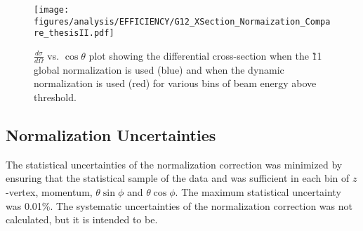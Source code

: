 \begin{figure}[h!]\begin{center}
\texttt{[image: \\figures/analysis/EFFICIENCY/G12\_XSection\_Normaization\_Compare\_thesisII.pdf]}
\caption[$\frac{d \sigma}{d \Omega}$ vs. $\cos \theta$ plot showing the  \piz differential cross-section when the \G11 global normalization is used (blue) and when the  dynamic normalization is used (red) for various bins of beam energy above  threshold]{\label{fig:toteff_compareII} $\frac{d \sigma}{d \Omega}$ vs. $\cos \theta$ plot showing the  \piz differential cross-section when the \G11 global normalization is used (blue) and when the  dynamic normalization is used (red) for various bins of beam energy above  threshold.}
\end{center}\end{figure}

\FloatBarrier

\subsection{Normalization Uncertainties}
The statistical uncertainties of the normalization correction was minimized by ensuring that the statistical sample of the data and  was sufficient in each bin of $z$-vertex, momentum, $\theta \sin\phi$ and $\theta \cos\phi$. The maximum statistical uncertainty was 0.01\%. The systematic uncertainties of the normalization correction was not calculated, but it is intended to be.